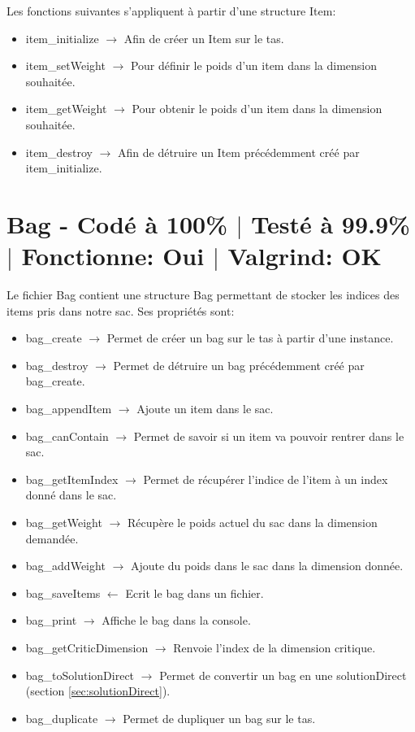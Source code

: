 \documentclass{EPUProjetPeiP}
\newcommand{\comp}[5]{
	\section[#1]{#1 {\small - Codé à #2\% $\vert$ Testé à #3\% $\vert$ Fonctionne: #4 $\vert$ Valgrind: #5}}
}
\begin{document}
Les fonctions suivantes s'appliquent à partir d'une structure Item:
\begin{itemize}
	\item item\_initialize $\longrightarrow$ Afin de créer un Item sur le tas.
	\item item\_setWeight $\longrightarrow$ Pour définir le poids d'un item dans la dimension souhaitée.
	\item item\_getWeight $\longrightarrow$ Pour obtenir le poids d'un item dans la dimension souhaitée.
	\item item\_destroy $\longrightarrow$ Afin de détruire un Item précédemment créé par item\_initialize.
\end{itemize}

\comp{Bag}{100}{99.9}{Oui}{OK}
Le fichier Bag contient une structure Bag permettant de stocker les indices des items pris dans notre sac. Ses propriétés sont:
\begin{itemize}
	\item bag\_create $\longrightarrow$ Permet de créer un bag sur le tas à partir d'une instance.
	\item bag\_destroy $\longrightarrow$ Permet de détruire un bag précédemment créé par bag\_create.
	\item bag\_appendItem $\longrightarrow$ Ajoute un item dans le sac.
	\item bag\_canContain $\longrightarrow$ Permet de savoir si un item va pouvoir rentrer dans le sac.
	\item bag\_getItemIndex $\longrightarrow$ Permet de récupérer l'indice de l'item à un index donné dans le sac.
	\item bag\_getWeight $\longrightarrow$ Récupère le poids actuel du sac dans la dimension demandée.
	\item bag\_addWeight $\longrightarrow$ Ajoute du poids dans le sac dans la dimension donnée.
	\item bag\_saveItems $\longleftarrow$ Ecrit le bag dans  un fichier.
	\item bag\_print $\longrightarrow$ Affiche le bag dans la console.
	\item bag\_getCriticDimension $\longrightarrow$ Renvoie l'index de la dimension critique.
	\item bag\_toSolutionDirect $\longrightarrow$ Permet de convertir un bag en une solutionDirect (section \ref{sec:solutionDirect}).
	\item bag\_duplicate $\longrightarrow$ Permet de dupliquer un bag sur le tas.
\end{itemize}
\end{document}
